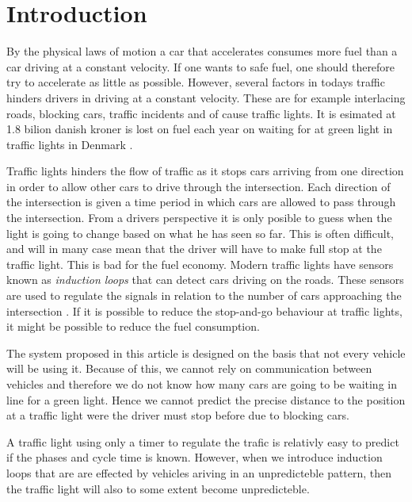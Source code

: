 \section{Introduction}

By the physical laws of motion a car that accelerates consumes more fuel than a car driving at a constant velocity. %
If one wants to safe fuel, one should therefore try to accelerate as little as possible. 
However, several factors in todays traffic hinders drivers in driving at a constant velocity. 
These are for example interlacing roads, blocking cars, traffic incidents and of cause traffic lights. 
It is esimated at 1.8 bilion danish kroner is lost on fuel each year on waiting for at green light in traffic lights in Denmark \cite{Vejdir}.

Traffic lights hinders the flow of traffic as it stops cars arriving from one direction in order to allow other cars to drive through the intersection.
Each direction of the intersection is given a time period in which cars are allowed to pass through the intersection. 
From a drivers perspective it is only posible to guess when the light is going to change based on what he has seen so far. 
This is often difficult, and will in many case mean that the driver will have to make full stop at the traffic light. This is bad for the fuel economy.
Modern traffic lights have sensors known as \textit{induction loops} that can detect cars driving on the roads.
These sensors are used to regulate the signals in relation to the number of cars approaching the intersection \cite{Vejdir}.
If it is possible to reduce the stop-and-go behaviour at traffic lights, it might be possible to reduce the fuel consumption.




The system proposed in this article is designed on the basis that not every vehicle will be using it. 
Because of this, we cannot rely on communication between vehicles and therefore we do not know how many cars are going to be waiting in line for a green light. %
Hence we cannot predict the precise distance to the position at a traffic light were the driver must stop before due to blocking cars.

A traffic light using only a timer to regulate the trafic is relativly easy to predict if the phases and cycle time is known. 
However, when we introduce induction loops that are are effected by vehicles ariving in an unpredicteble pattern, then the traffic light will also to some extent become unpredicteble. 

